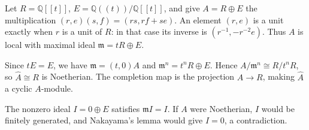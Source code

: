 Let $R=\mathbb{Q}[[t]]$, $E=\mathbb{Q}((t))/\mathbb{Q}[[t]]$, and give $A=R\oplus E$ the multiplication $(r,e)(s,f)=(rs,rf+se)$. An element $(r,e)$ is a unit exactly when $r$ is a unit of $R$: in that case its inverse is $(r^{-1},-r^{-2}e)$. Thus $A$ is local with maximal ideal $\mathfrak{m}=tR\oplus E$.

Since $tE=E$, we have $\mathfrak{m}=(t,0)A$ and $\mathfrak{m}^n=t^nR\oplus E$. Hence $A/\mathfrak{m}^n\cong R/t^nR$, so $\widehat A\cong R$ is Noetherian. The completion map is the projection $A\to R$, making $\widehat A$ a cyclic $A$-module.

The nonzero ideal $I=0\oplus E$ satisfies $\mathfrak{m}I=I$. If $A$ were Noetherian, $I$ would be finitely generated, and Nakayama's lemma would give $I=0$, a contradiction.
